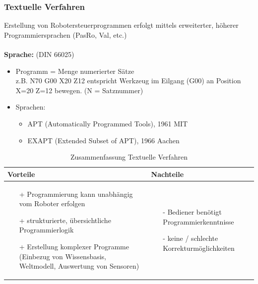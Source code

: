 \documentclass[11pt]{scrartcl}
\begin{document}
\subsubsection{Textuelle Verfahren}
Erstellung von Robotersteuerprogrammen erfolgt mittels erweiterter,
höherer Programmiersprachen (PasRo, Val, etc.)
\\ \\
\textbf{Sprache:} (DIN 66025)
\begin{itemize}
\item Programm = Menge numerierter Sätze\\
z.B. \glqq N70 G00 X20 Z12\grqq{} entspricht Werkzeug im Eilgang (G00) an Position X=20 Z=12 bewegen. (N = Satznummer)
\item Sprachen:
\begin{itemize}
\item APT (Automatically Programmed Tools), 1961 MIT
\item EXAPT (Extended Subset of APT), 1966 Aachen
\end{itemize}
\end{itemize}

\begin{table}[!h]
\centering
\begin{tabular}{|p{7.5cm}|p{7.5cm}|}
\hline
Vorteile & Nachteile\\
\hline
\vspace{-5mm}
\begin{itemize}
\setlength\itemsep{0em}
\item[+] Programmierung kann unabhängig vom Roboter erfolgen
\item[+] strukturierte, übersichtliche Programmierlogik
\item[+] Erstellung komplexer Programme (Einbezug von Wissensbasis,
Weltmodell, Auswertung von Sensoren)
\end{itemize}
 &
 \vspace{-5mm}
\begin{itemize}
\setlength\itemsep{0em}
\item[-] Bediener benötigt Programmierkenntnisse
\item[-] keine / schlechte Korrekturmöglichkeiten
\end{itemize}\\
\hline
\end{tabular}
\caption{Zusammenfassung Textuelle Verfahren}
\label{tab:textprog}
\end{table}
\end{document}
